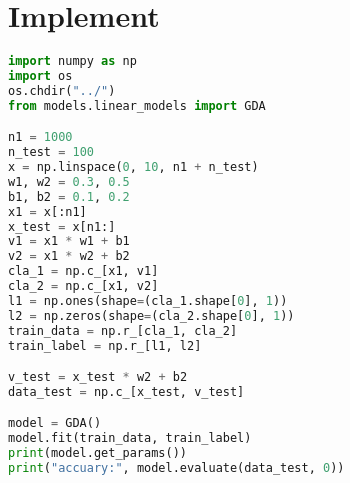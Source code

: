 \documentclass{report}
\begin{document}
\section{Implement}
\begin{lstlisting}[language={python}]
import numpy as np
import os
os.chdir("../")
from models.linear_models import GDA

n1 = 1000
n_test = 100
x = np.linspace(0, 10, n1 + n_test)
w1, w2 = 0.3, 0.5
b1, b2 = 0.1, 0.2
x1 = x[:n1]
x_test = x[n1:]
v1 = x1 * w1 + b1
v2 = x1 * w2 + b2
cla_1 = np.c_[x1, v1]
cla_2 = np.c_[x1, v2]
l1 = np.ones(shape=(cla_1.shape[0], 1))
l2 = np.zeros(shape=(cla_2.shape[0], 1))
train_data = np.r_[cla_1, cla_2]
train_label = np.r_[l1, l2]

v_test = x_test * w2 + b2
data_test = np.c_[x_test, v_test]

model = GDA()
model.fit(train_data, train_label)
print(model.get_params())
print("accuary:", model.evaluate(data_test, 0))
\end{lstlisting}
\end{document}
